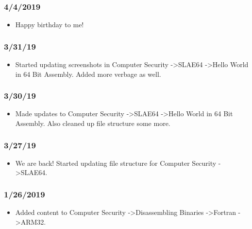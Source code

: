 \subsubsection{4/4/2019}

\begin{itemize}
\item Happy birthday to me!
\end{itemize}

\subsubsection{3/31/19}

\begin{itemize}
\item Started updating screenshots in Computer Security -\textgreater  SLAE64 -\textgreater  Hello World in 64 Bit Assembly. Added more verbage as well.
\end{itemize}

\subsubsection{3/30/19}

\begin{itemize}
\item Made updates to Computer Security -\textgreater  SLAE64 -\textgreater  Hello World in 64 Bit Assembly. Also cleaned up file structure some more.
\end{itemize}

\subsubsection{3/27/19}

\begin{itemize}
\item We are back! Started updating file structure for Computer Security -\textgreater  SLAE64.
\end{itemize}

\subsubsection{1/26/2019}

\begin{itemize}
\item Added content to Computer Security -\textgreater  Disassembling Binaries -\textgreater  Fortran -\textgreater  ARM32.
\end{itemize}

